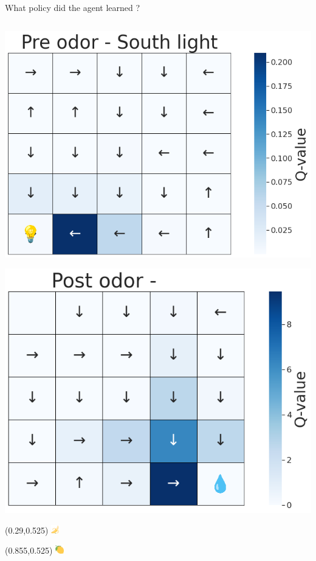 \documentclass[bigger]{beamer}
\begin{document}
\begin{frame}[label={sec:orgf1093f7}]{What policy did the agent learned ?}
\begin{columns}
\begin{column}[t]{0.5\columnwidth}
\begin{center}
\includegraphics[height=0.4\textheight]{img/policy-allo-south-light.png}
\end{center}
\begin{center}
\includegraphics[height=0.4\textheight]{img/policy-allo-odor-B.png}
\end{center}
\begin{textblock}{0.2}(0.29,0.525)%
\includegraphics[height=1em]{img/banana.png}
\end{textblock}
\begin{textblock}{0.2}(0.855,0.525)%
\includegraphics[height=1em]{img/lemon.png}
\end{textblock}
\end{column}
\end{columns}
\end{frame}
\end{document}
